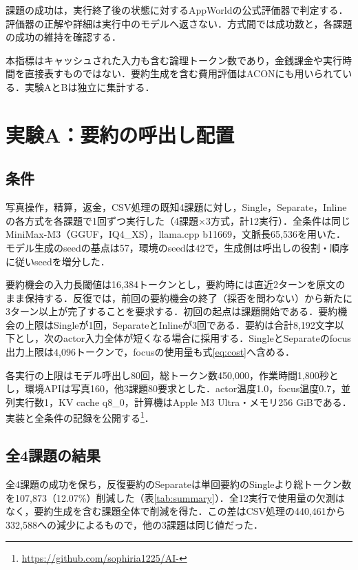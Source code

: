 \documentclass[letter]{ieicej}
\begin{document}
課題の成功は，実行終了後の状態に対するAppWorld\cite{trivedi2024appworld}の公式評価器で判定する．評価器の正解や詳細は実行中のモデルへ返さない．方式間では成功数と，各課題の成功の維持を確認する．

本指標はキャッシュされた入力も含む論理トークン数であり，金銭課金や実行時間を直接表すものではない\cite{xu2026tokenpilot}．要約生成を含む費用評価はACON\cite{kang2026acon}にも用いられている．実験AとBは独立に集計する．

\newpage
\section{実験A：要約の呼出し配置}

\subsection{条件}

写真操作，精算，返金，CSV処理の既知4課題に対し，Single，Separate，Inlineの各方式を各課題で1回ずつ実行した（4課題×3方式，計12実行）．全条件は同じMiniMax-M3（GGUF，IQ4\_XS），llama.cpp b11669，文脈長65,536を用いた．モデル生成のseedの基点は57，環境のseedは42で，生成側は呼出しの役割・順序に従いseedを増分した．

要約機会の入力長閾値は16,384トークンとし，要約時には直近2ターンを原文のまま保持する．反復では，前回の要約機会の終了（採否を問わない）から新たに3ターン以上が完了することを要求する．初回の起点は課題開始である．要約機会の上限はSingleが1回，SeparateとInlineが3回である．要約は合計8,192文字以下とし，次のactor入力全体が短くなる場合に採用する．SingleとSeparateのfocus出力上限は4,096トークンで，focusの使用量も式\eqref{eq:cost}へ含める．

各実行の上限はモデル呼出し80回，総トークン数450,000，作業時間1,800秒とし，環境APIは写真160，他3課題80要求とした．actor温度1.0，focus温度0.7，並列実行数1，KV cache q8\_0，計算機はApple M3 Ultra・メモリ256 GiBである．実装と全条件の記録を公開する\footnote{\url{https://github.com/sophiria1225/AI-}}．

\subsection{全4課題の結果}

全4課題の成功を保ち，反復要約のSeparateは単回要約のSingleより総トークン数を107,873（12.07\%）削減した（表\ref{tab:summary}）．全12実行で使用量の欠測はなく，要約生成を含む課題全体で削減を得た．この差はCSV処理の440,461から332,588への減少によるもので，他の3課題は同じ値だった．
\end{document}
